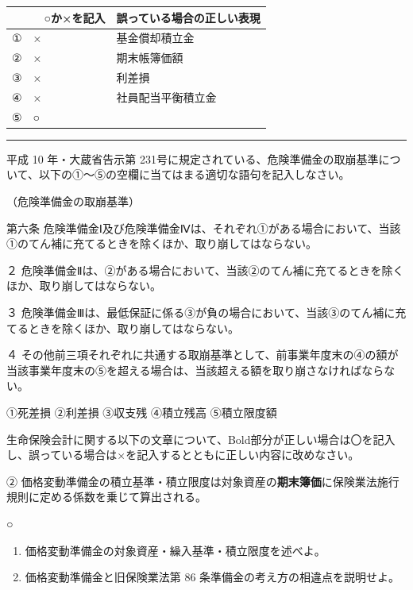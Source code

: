 \documentclass[report,gutter=10mm,fore-edge=10mm,uplatex,dvipdfmx]{jlreq}
\begin{document}

\begin{longtable}[]{@{}lll@{}}
\toprule
& 　○か×を記入 & 誤っている場合の正しい表現\tabularnewline
\midrule
\endhead
① & × & 基金償却積立金\tabularnewline
② & × & 期末帳簿価額\tabularnewline
③ & × & 利差損\tabularnewline
④ & × & 社員配当平衡積立金\tabularnewline
⑤ & ○ &\tabularnewline
\bottomrule
\end{longtable}

\begin{center}\rule{0.5\linewidth}{0.5pt}\end{center}


平成 10 年・大蔵省告示第 231号に規定されている、危険準備金の取崩基準について、以下の①～⑤の空欄に当てはまる適切な語句を記入しなさい。

（危険準備金の取崩基準）

 第六条  危険準備金Ⅰ及び危険準備金Ⅳは、それぞれ①がある場合において、当該①のてん補に充てるときを除くほか、取り崩してはならない。

２  危険準備金Ⅱは、②がある場合において、当該②のてん補に充てるときを除くほか、取り崩してはならない。

３  危険準備金Ⅲは、最低保証に係る③が負の場合において、当該③のてん補に充てるときを除くほか、取り崩してはならない。

４  その他前三項それぞれに共通する取崩基準として、前事業年度末の④の額が当該事業年度末の⑤を超える場合は、当該超える額を取り崩さなければならない。


①死差損 ②利差損 ③収支残 ④積立残高 ⑤積立限度額


生命保険会計に関する以下の文章について、Bold部分が正しい場合は〇を記入し、誤っている場合は×を記入するとともに正しい内容に改めなさい。

②
価格変動準備金の積立基準・積立限度は対象資産の\textbf{期末簿価}に保険業法施行規則に定める係数を乗じて算出される。

○


\begin{enumerate}
 \item 価格変動準備金の対象資産・繰入基準・積立限度を述べよ。
 \item 価格変動準備金と旧保険業法第 86 条準備金の考え方の相違点を説明せよ。
\end{enumerate}
\end{document}
